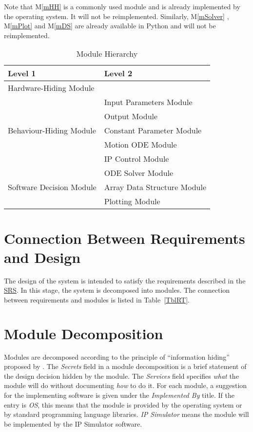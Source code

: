 \documentclass[12pt, titlepage]{article}
\newcommand{\mref}[1]{M\ref{#1}}
\begin{document}
Note that \mref{mHH} is a commonly used module and is already implemented by the operating system.  It will not be reimplemented.  Similarly, \mref{mSolver} , \mref{mPlot} and  \mref{mDS} are already available in Python and will not be reimplemented.



\begin{table}[h!]
\centering
\begin{tabular}{p{} p{}}
\toprule
\textbf{Level 1} & \textbf{Level 2}\\
\midrule

{Hardware-Hiding Module} & ~ \\
\midrule

\multirow{5}{0.3\textwidth}{Behaviour-Hiding Module} & Input Parameters Module\\
& Output Module\\
& Constant Parameter Module\\
&Motion ODE  Module\\
& IP Control Module\\
\midrule

\multirow{3}{0.3\textwidth}{Software Decision Module} & {ODE Solver Module}\\
& Array Data Structure Module\\
& Plotting Module\\
\bottomrule

\end{tabular}
\caption{Module Hierarchy}
\label{TblMH}
\end{table}

\section{Connection Between Requirements and Design} \label{SecConnection}

The design of the system is intended to satisfy the requirements described in the \href{https://github.com/MinMah23/CAS741-Project/tree/main/docs/SRS}{SRS}. In this stage, the system is decomposed into modules. The connection
between requirements and modules is listed in Table~\ref{TblRT}.


\section{Module Decomposition} \label{SecMD}

Modules are decomposed according to the principle of ``information hiding''
proposed by \citet{ParnasEtAl1984}. The \emph{Secrets} field in a module
decomposition is a brief statement of the design decision hidden by the
module. The \emph{Services} field specifies \emph{what} the module will do
without documenting \emph{how} to do it. For each module, a suggestion for the implementing software is given under the \emph{Implemented By} title. If the entry is \emph{OS}, this means that the module is provided by the operating system or by standard programming language libraries.  \emph{IP Simulator} means the module will be implemented by the IP Simulator software.
\end{document}

